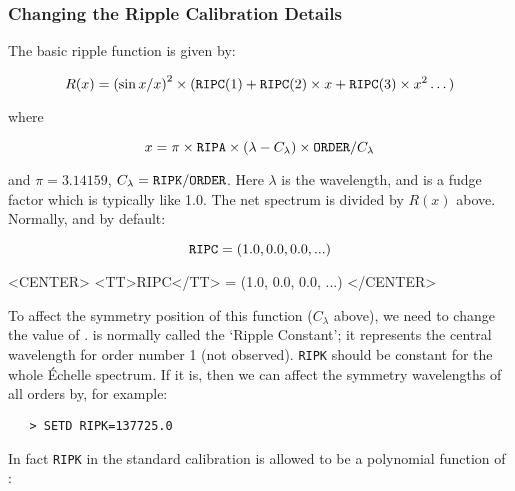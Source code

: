 \subsubsection{Changing the Ripple Calibration Details}

The basic ripple function is given by:

\begin{displaymath}
R(x) =
{(\sin x / x )}^{2} \times
({\tt RIPC}(1) + {\tt RIPC}(2) \times x + {\tt RIPC}(3) \times x^{2}\dots)
\end{displaymath}

where

\begin{displaymath}
x = \pi \times {\tt RIPA} \times (\lambda - C_{\lambda}) \times {\tt ORDER} /
C_{\lambda}
\end{displaymath}

and $\pi =3.14159$, $C_{\lambda}={\tt RIPK}/{\tt ORDER}$\@.  Here $\lambda$ is
the wavelength, and  is a fudge factor which is
typically like 1.0.  The net spectrum is divided by $R(x)$ above.
Normally, and by default:

\begin{latexonly}
\begin{displaymath}
{\tt RIPC} = (1.0, 0.0, 0.0, ...)
\end{displaymath}
\end{latexonly}

\begin{htmlonly}
\begin{rawhtml}
<CENTER>
<TT>RIPC</TT> = (1.0, 0.0, 0.0, ...)
</CENTER>
\end{rawhtml}
\end{htmlonly}

To affect the symmetry position of this function ($C_{\lambda}$ above), we need
to change the value of \@.
 is normally called the
`Ripple Constant'; it represents the central wavelength for order number 1 (not
observed)\@.  \verb+RIPK+ should be constant for the whole \'{E}chelle spectrum.
If it is, then we can affect the symmetry wavelengths of all orders by, for
example:

\begin{verbatim}
   > SETD RIPK=137725.0
\end{verbatim}

In fact \verb+RIPK+ in the standard calibration is allowed to be a polynomial
function of :

